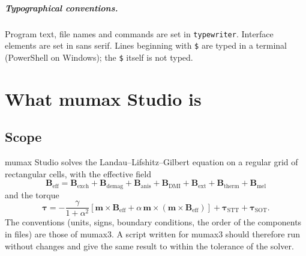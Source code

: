\documentclass[11pt,a4paper,oneside]{book}
\newcommand{\code}[1]{\texttt{#1}}
\renewcommand{\_}{\textunderscore\allowbreak}
\newcommand{\menu}[1]{\textsf{#1}}
\begin{document}
\paragraph{Typographical conventions.} Program text, file names and commands are set in \code{typewriter}.
Interface elements are set in \menu{sans serif}. Lines beginning with \code{\$} are typed in a terminal
(\menu{PowerShell} on Windows); the \code{\$} itself is not typed.

\tableofcontents

\mainmatter

\chapter{What mumax Studio is}\label{ch:intro}

\section{Scope}

mumax Studio solves the Landau--Lifshitz--Gilbert equation on a regular grid of rectangular cells, with the
effective field
\begin{equation}
\mathbf B_\text{eff} = \mathbf B_\text{exch} + \mathbf B_\text{demag} + \mathbf B_\text{anis}
 + \mathbf B_\text{DMI} + \mathbf B_\text{ext} + \mathbf B_\text{therm} + \mathbf B_\text{mel}
\end{equation}
and the torque
\begin{equation}
\boldsymbol\tau = -\frac{\gamma}{1+\alpha^2}\left[\mathbf m\times\mathbf B_\text{eff}
 + \alpha\,\mathbf m\times(\mathbf m\times\mathbf B_\text{eff})\right]
 + \boldsymbol\tau_\text{STT} + \boldsymbol\tau_\text{SOT}.
\end{equation}
The conventions (units, signs, boundary conditions, the order of the components in files) are those of
mumax3. A script written for mumax3 should therefore run without changes and give the same result to within
the tolerance of the solver.
\end{document}

